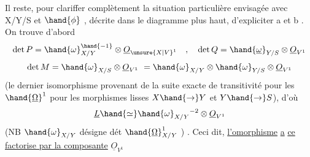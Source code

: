 Il reste, pour clariffer complètement la situation particulière
envisagée avec X/Y/S et $\hand{\phi}$ , décrite dans le diagramme  plus haut, 
d'expliciter a et b . On trouve d'abord
\[ \det P = \hand{\omega}_{X/Y}^{\hand{-1}} \otimes \underline{O}_{\unsure{X|V}^{1}} \quad , \quad \det Q = \hand{\underline{\omega}}_{Y/S} \otimes \underline{O}_{V^{1}} \]
\[ \det M = \hand{\omega}_{X/S} \otimes \underline{O}_{V^{1}} \ = \hand{\omega}_{X/Y} \otimes \hand{\omega}_{Y/S} \otimes \underline{O}_{V^{1}} \]
(le dernier isomorphisme provenant de la suite exacte de transitivité
pour les $\hand{\underline{\Omega}}^1$ pour les morphismes lisses $X\hand{\to}Y$ et $Y\hand{\to}S$), d'où
\[ \underline{L} \hand{\simeq} \hand{\omega}_{X/Y}{}^{-2} \otimes \underline{O}_{V^{1}} \]
(NB $\hand{\omega}_{X/Y}$ désigne  dét $\hand{\underline{\Omega}}^1_{X/Y}$ ) . Ceci dit, \uline{l'omorphisme} \uline{a} \uline{ce}
\uline{factorise par la composante} $\underline{O}_{V^{1}}$

